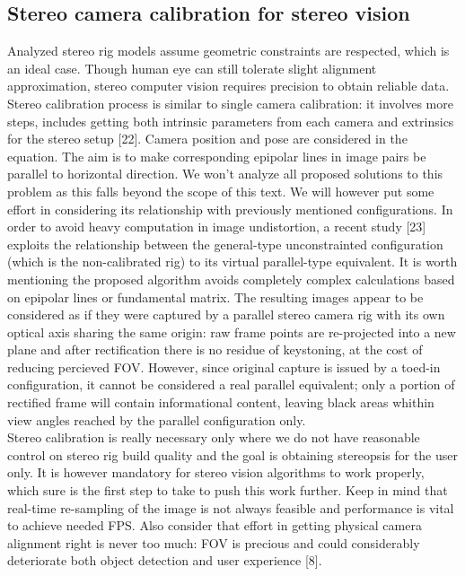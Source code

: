 \subsection{Stereo camera calibration for stereo vision}
Analyzed stereo rig models assume geometric constraints are respected, which is an ideal case. Though human eye can still tolerate slight alignment approximation, stereo computer vision requires precision to obtain reliable data. Stereo calibration process is similar to single camera calibration: it involves more steps, includes getting both intrinsic parameters from each camera and extrinsics for the stereo setup [22]. Camera position and pose are considered in the equation. The aim is to make corresponding epipolar lines in image pairs be parallel to horizontal direction. We won’t analyze all proposed solutions to this problem as this falls beyond the scope of this text. We will however put some effort in considering its relationship with previously mentioned configurations. In order to avoid heavy computation in image undistortion, a recent study [23] exploits the relationship between the general-type unconstrainted configuration (which is the non-calibrated rig) to its virtual parallel-type equivalent. It is worth mentioning the proposed algorithm avoids completely complex calculations based on epipolar lines or fundamental matrix. The resulting images appear to be considered as if they were captured by a parallel stereo camera rig with its own optical axis sharing the same origin: raw frame points are re-projected into a new plane and after rectification there is no residue of keystoning, at the cost of reducing percieved FOV. However, since original capture is issued by a toed-in configuration, it cannot be considered a real parallel equivalent; only a portion of rectified frame will contain informational content, leaving black areas whithin view angles reached by the parallel configuration only.
\\
Stereo calibration is really necessary only where we do not have reasonable control on stereo rig build quality and the goal is obtaining stereopsis for the user only. It is however mandatory for stereo vision algorithms to work properly, which sure is the first step to take to push this work further. Keep in mind that real-time re-sampling of the image is not always feasible and performance is vital to achieve needed FPS. Also consider that effort in getting physical camera alignment right is never too much: FOV is precious and could considerably deteriorate both object detection and user experience [8].

